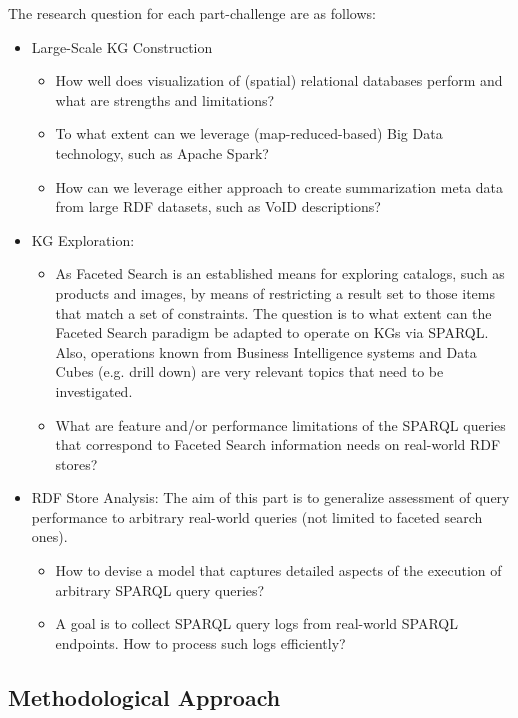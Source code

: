 The research question for each part-challenge are as follows:

\begin{itemize}
\item Large-Scale KG Construction
  \begin{itemize}
    \item How well does visualization of (spatial) relational databases perform and what are strengths and limitations?
    \item To what extent can we leverage (map-reduced-based) Big Data technology, such as Apache Spark?
    \item How can we leverage either approach to create summarization meta data from large RDF datasets, such as VoID descriptions?
  \end{itemize}
\item KG Exploration:
  \begin{itemize}
  \item As Faceted Search is an established means for exploring catalogs, such as products and images, by means of restricting a result set to those items that match a set of constraints. The question is to what extent can the Faceted Search paradigm be adapted to operate on KGs via SPARQL.  Also, operations known from Business Intelligence systems and Data Cubes (e.g. drill down) are very relevant topics that need to be investigated.
  \item What are feature and/or performance limitations of the SPARQL queries that correspond to Faceted Search information needs on real-world RDF stores?
  \end{itemize}
\item RDF Store Analysis: The aim of this part is to generalize assessment of query performance to arbitrary real-world queries (not limited to faceted search ones).
  \begin{itemize}
  \item How to devise a model that captures detailed aspects of the execution of arbitrary SPARQL query queries?
  \item A goal is to collect SPARQL query logs from real-world SPARQL endpoints. How to process such logs efficiently?
  \end{itemize}
\end{itemize}

\subsection{Methodological Approach}

